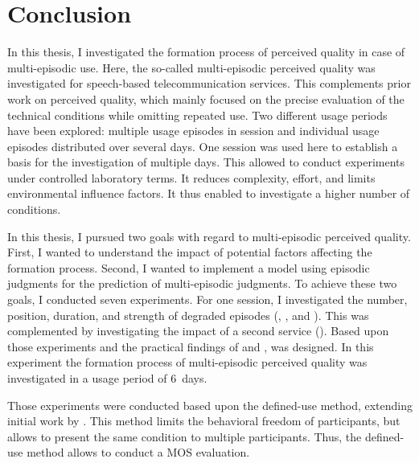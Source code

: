 \chapter{Conclusion}\label{chap:discussion}
In this thesis, I investigated the formation process of perceived quality in case of multi-episodic use.
Here, the so-called multi-episodic perceived quality was investigated for speech-based telecommunication services.
This complements prior work on perceived quality, which mainly focused on the precise evaluation of the technical conditions while omitting repeated use.
Two different usage periods have been explored: multiple usage episodes in session and individual usage episodes distributed over several days.
One session was used here to establish a basis for the investigation of multiple days.
This allowed to conduct experiments under controlled laboratory terms.
It reduces complexity, effort, and limits environmental influence factors.
It thus enabled to investigate a higher number of conditions.

In this thesis, I pursued two goals with regard to multi-episodic perceived quality.
First, I wanted to understand the impact of potential factors affecting the formation process.
Second, I wanted to implement a model using episodic judgments for the prediction of multi-episodic judgments.
To achieve these two goals, I conducted seven experiments.
For one session, I investigated the number, position, duration, and strength of degraded episodes (, \EIIa{}, and ).
This was complemented by investigating the impact of a second service (\EIIb{}).
Based upon those experiments and the practical findings of  and ,  was designed.
In this experiment the formation process of multi-episodic perceived quality was investigated in a usage period of 6~days.

Those experiments were conducted based upon the defined-use method, extending initial work by \citet{moller_single-call_2011}.
This method limits the behavioral freedom of participants, but allows to present the same condition to multiple participants.
Thus, the defined-use method allows to conduct a \ac{MOS} evaluation.

